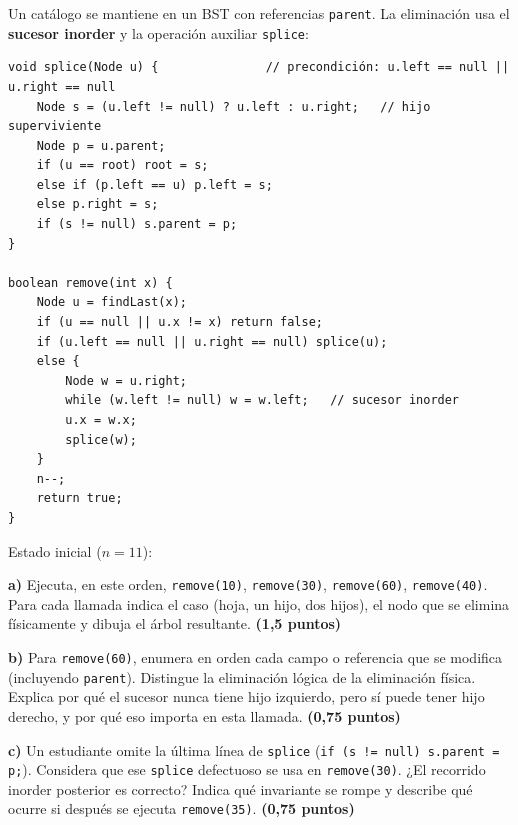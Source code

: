 \documentclass[11pt,a4paper]{article}
\newcommand{\pts}[1]{\textbf{(#1)}}
\begin{document}
Un catálogo se mantiene en un BST con referencias \texttt{parent}. La eliminación usa el \textbf{sucesor inorder} y la operación auxiliar \texttt{splice}:

\begin{lstlisting}
void splice(Node u) {               // precondición: u.left == null || u.right == null
    Node s = (u.left != null) ? u.left : u.right;   // hijo superviviente
    Node p = u.parent;
    if (u == root) root = s;
    else if (p.left == u) p.left = s;
    else p.right = s;
    if (s != null) s.parent = p;
}

boolean remove(int x) {
    Node u = findLast(x);
    if (u == null || u.x != x) return false;
    if (u.left == null || u.right == null) splice(u);
    else {
        Node w = u.right;
        while (w.left != null) w = w.left;   // sucesor inorder
        u.x = w.x;
        splice(w);
    }
    n--;
    return true;
}
\end{lstlisting}

Estado inicial ($n = 11$):

\begin{center}
\end{center}

\textbf{a)} Ejecuta, en este orden, \texttt{remove(10)}, \texttt{remove(30)}, \texttt{remove(60)}, \texttt{remove(40)}. Para cada llamada indica el caso (hoja, un hijo, dos hijos), el nodo que se elimina físicamente y dibuja el árbol resultante. \pts{1,5 puntos}

\textbf{b)} Para \texttt{remove(60)}, enumera en orden cada campo o referencia que se modifica (incluyendo \texttt{parent}). Distingue la eliminación lógica de la eliminación física. Explica por qué el sucesor nunca tiene hijo izquierdo, pero sí puede tener hijo derecho, y por qué eso importa en esta llamada. \pts{0,75 puntos}

\textbf{c)} Un estudiante omite la última línea de \texttt{splice} (\texttt{if (s != null) s.parent = p;}). Considera que ese \texttt{splice} defectuoso se usa en \texttt{remove(30)}. ¿El recorrido inorder posterior es correcto? Indica qué invariante se rompe y describe qué ocurre si después se ejecuta \texttt{remove(35)}. \pts{0,75 puntos}
\end{document}
